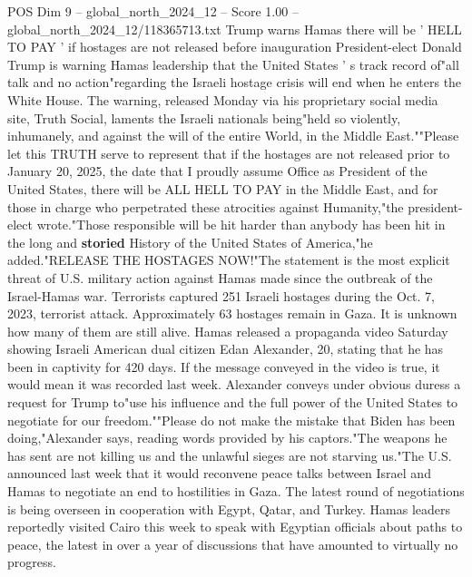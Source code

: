 \begin{textsample}{POS Dim 9 – global\_north\_2024\_12 – Score 1.00 – global\_north\_2024\_12/118365713.txt}  \label{ex:f9_pos_339}
Trump warns Hamas there will be ' HELL TO PAY ' if hostages are not released before inauguration President-elect Donald Trump is warning Hamas leadership that the United States ' s track record of"all talk and no action"regarding the Israeli hostage crisis will end when he enters the White House.
The warning, released Monday via his proprietary social media site, Truth Social, laments the Israeli nationals being"held so violently, inhumanely, and against the will of the entire World, in the Middle East.""Please let this TRUTH serve to represent that if the hostages are not released prior to January 20, 2025, the date that I proudly assume Office as President of the United States, there will be ALL HELL TO PAY in the Middle East, and for those in charge who perpetrated these atrocities against Humanity,"the president-elect wrote."Those responsible will be hit harder than anybody has been hit in the long and \textbf{storied} History of the United States of America,"he added."RELEASE THE HOSTAGES NOW!"The statement is the most explicit threat of U.S. military action against Hamas made since the outbreak of the Israel-Hamas war.
Terrorists captured 251 Israeli hostages during the Oct. 7, 2023, terrorist attack.
Approximately 63 hostages remain in Gaza.
It is unknown how many of them are still alive.
Hamas released a propaganda video Saturday showing Israeli American dual citizen Edan Alexander, 20, stating that he has been in captivity for 420 days.
If the message conveyed in the video is true, it would mean it was recorded last week.
Alexander conveys under obvious duress a request for Trump to"use his influence and the full power of the United States to negotiate for our freedom.""Please do not make the mistake that Biden has been doing,"Alexander says, reading words provided by his captors."The weapons he has sent are not killing us and the unlawful sieges are not starving us."The U.S. announced last week that it would reconvene peace talks between Israel and Hamas to negotiate an end to hostilities in Gaza.
The latest round of negotiations is being overseen in cooperation with Egypt, Qatar, and Turkey.
Hamas leaders reportedly visited Cairo this week to speak with Egyptian officials about paths to peace, the latest in over a year of discussions that have amounted to virtually no progress.

\end{textsample}
